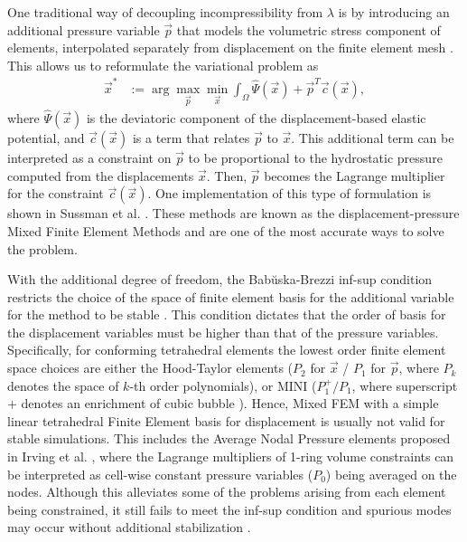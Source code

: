 One traditional way of decoupling incompressibility from $\lambda$ is by introducing an
additional pressure variable $\vec{p}$ that models the volumetric stress component of elements,
interpolated separately from displacement on the finite element mesh \cite{Bathe:2006}. This allows us to reformulate the variational problem as
\begin{align}
\vec{x}^* &:= \arg \max_{\vec{p}} \min_{\vec{x}} \int_{\Omega} \hat{\Psi}(\vec{x}) + \vec{p}^T \vec{c}(\vec{x}),
\label{eq:mixed_variational}
\end{align}
where $\hat{\Psi}(\vec{x})$ is the deviatoric component of the displacement-based elastic potential,
and $\vec{c}(\vec{x})$ is a term that relates $\vec{p}$ to $\vec{x}$. This additional term can be
interpreted as a constraint on $\vec{p}$ to be proportional to the hydrostatic pressure computed
from the displacements $\vec{x}$. Then, $\vec{p}$ becomes the Lagrange multiplier for the constraint
$\vec{c}(\vec{x})$.  One implementation of this type of formulation is shown in Sussman et al.
.  These methods are known as the displacement-pressure Mixed Finite Element
Methods and are one of the most accurate ways to solve the problem.

With the additional degree of freedom, the Bab\u{u}ska-Brezzi inf-sup condition restricts the 
choice of the space of finite element basis for the additional variable for the method to be stable \cite{bathe:2001}. 
This condition dictates that the order of basis for the displacement variables must be higher than that
of the pressure 
variables. Specifically, for conforming tetrahedral elements the lowest order finite element space choices are either 
the Hood-Taylor elements ($P_2$ for $\vec{x}$ / $P_1$ for $\vec{p}$, where $P_k$ denotes the space of $k$-th order polynomials), or MINI ($P_1^+ / P_1$, where superscript $+$ denotes an enrichment of cubic bubble \cite{arnold:1984}).
Hence, Mixed FEM with a simple linear tetrahedral Finite Element basis for displacement is usually not valid for stable simulations. 
This includes the Average Nodal Pressure elements proposed in Irving et al. , where the Lagrange multipliers of 1-ring volume constraints can be interpreted as cell-wise constant pressure variables ($P_0$) being averaged on the nodes. Although this alleviates some of the problems arising from each element being constrained, it still fails to meet the inf-sup condition and spurious modes may occur without additional stabilization \cite{puso:2006}. 

